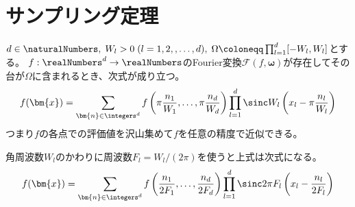 \chapter{サンプリング定理}
    \begin{shadebox}
        $d\in\naturalNumbers,\;W_l>0\;(l=1,2,,\dots,d),\;\Omega\coloneqq\prod_{l=1}^d [-W_l,W_l]$とする。
        $f:\realNumbers^d\to\realNumbers$のFourier変換$\mathcal{F}(f,\bm{\omega})$が存在してその台が$\Omega$に含まれるとき、次式が成り立つ。
        \[ f(\bm{x}) = \sum_{\bm{n}\in\integers^d}f\left(\pi\frac{n_1}{W_1},\dots,\pi\frac{n_d}{W_d}\right)\prod_{l=1}^d\sinc W_l\left(x_l - \pi\frac{n_l}{W_l}\right) \]
        つまり$f$の各点での評価値を沢山集めて$f$を任意の精度で近似できる。
        \par
        角周波数$W_l$のかわりに周波数$F_l=W_l/(2\pi)$を使うと上式は次式になる。
        \[ f(\bm{x}) = \sum_{\bm{n}\in\integers^d}f\left(\frac{n_1}{2F_1},\dots,\frac{n_d}{2F_d}\right)\prod_{l=1}^d\sinc 2\pi F_l\left(x_l - \frac{n_l}{2F_l}\right) \]
    \end{shadebox}
